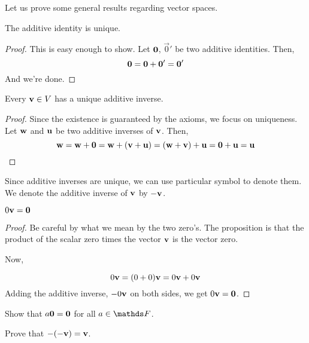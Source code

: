 Let us prove some general results regarding vector spaces. 

\begin{proposition}
    The additive identity is unique.
\end{proposition}

\begin{proof}
    This is easy enough to show. Let \(\boldsymbol{\mathbf{0}}\), \(\vec{0}'\) be two additive identities.
    Then, 
    \begin{equation*}
        \boldsymbol{\mathbf{0}} = \boldsymbol{\mathbf{0}} + \boldsymbol{\mathbf{0}}' = \boldsymbol{\mathbf{0}}'
    \end{equation*}
    And we're done.
\end{proof}

\begin{proposition}
    Every \(\boldsymbol{\mathbf{v}} \in V\) has a unique additive inverse.
\end{proposition}

\begin{proof}
    Since the existence is guaranteed by the axioms, we focus on uniqueness.
    Let \(\boldsymbol{\mathbf{w}}\) and \(\boldsymbol{\mathbf{u}}\) be two additive inverses of \(\boldsymbol{\mathbf{v}}\). Then,
    \begin{equation*}
        \boldsymbol{\mathbf{w}} = \boldsymbol{\mathbf{w}} + \boldsymbol{\mathbf{0}} = \boldsymbol{\mathbf{w}} + (\boldsymbol{\mathbf{v}} + \boldsymbol{\mathbf{u}}) = (\boldsymbol{\mathbf{w}} + \boldsymbol{\mathbf{v}}) + \boldsymbol{\mathbf{u}} = \boldsymbol{\mathbf{0}} + \boldsymbol{\mathbf{u}} = \boldsymbol{\mathbf{u}} 
    \end{equation*}
\end{proof}

Since additive inverses are unique, we can use particular symbol to denote them. We denote 
the additive inverse of \(\boldsymbol{\mathbf{v}}\) by \(-\boldsymbol{\mathbf{v}}\). 

\begin{proposition}
    \(0\boldsymbol{\mathbf{v}} = \boldsymbol{\mathbf{0}}\)
\end{proposition}

\begin{proof}
    Be careful by what we mean by the two zero's. The proposition is that the 
    product of the scalar zero times the vector \(\boldsymbol{\mathbf{v}}\) is the vector zero.

    Now,

    \begin{equation*}
        0\boldsymbol{\mathbf{v}} = (0 + 0)\boldsymbol{\mathbf{v}} = 0\boldsymbol{\mathbf{v}} + 0\boldsymbol{\mathbf{v}}
    \end{equation*}
    Adding the additive inverse, \(-0\boldsymbol{\mathbf{v}}\) on both sides, we get \(0\boldsymbol{\mathbf{v}} = \boldsymbol{\mathbf{0}}\).
\end{proof}

\begin{exc}
    \begin{exercise}[points = 1]
        Show that \(a\boldsymbol{\mathbf{0}} = \boldsymbol{\mathbf{0}}\) for all \(a \in \FF\).
    \end{exercise}
    \begin{exercise}[points = 1]
        Prove that \(-(-\boldsymbol{\mathbf{v}}) = \boldsymbol{\mathbf{v}}\).
    \end{exercise}
\end{exc}
